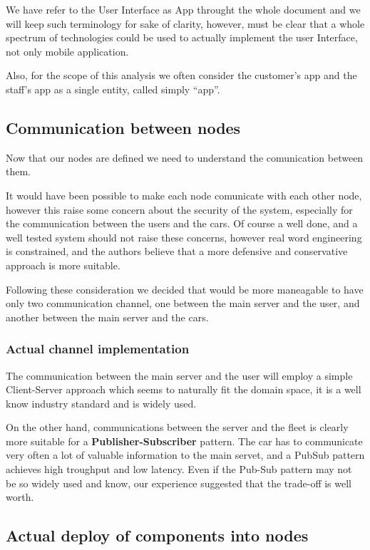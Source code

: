 \documentclass[11pt]{article} %
\begin{document}
We have refer to the User Interface as App throught the whole document and we will keep such terminology for sake of clarity, however, must be clear that a whole spectrum of technologies could be used to actually implement the user Interface, not only mobile application.

Also, for the scope of this analysis we often consider the customer's app and the staff's app as a single entity, called simply ``app''.


\subsection{Communication between nodes}

Now that our nodes are defined we need to understand the comunication between them.

It would have been possible to make each node comunicate with each other node, however this raise some concern about the security of the system, especially for the communication between the users and the cars. Of course a well done, and a well tested system should not raise these concerns, however real word engineering is constrained, and the authors believe that a more defensive and conservative approach is more suitable.

Following these consideration we decided that would be more maneagable to have only two communication channel, one between the main server and the user, and another between the main server and the cars. 

\subsubsection{Actual channel implementation}

The communication between the main server and the user will employ a simple Client-Server approach which seems to naturally fit the domain space, it is a well know industry standard and is widely used.

On the other hand, communications between the server and the fleet is clearly more suitable for a \textbf{Publisher-Subscriber} pattern. The car has to communicate very often a lot of valuable information to the main servet, and a PubSub pattern achieves high troughput and low latency. Even if the Pub-Sub pattern may not be so widely used and know, our experience suggested that the trade-off is well worth.

\subsection{Actual deploy of components into nodes}
\end{document}
